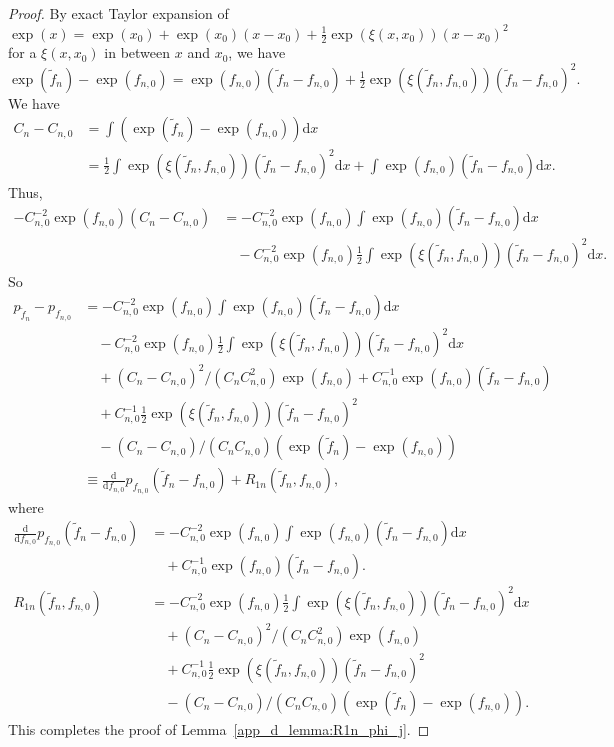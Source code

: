 \begin{proof}
By exact Taylor expansion of $\exp(x)=\exp(x_0)+\exp(x_0)(x-x_0)+\tfrac{1}{2}\exp(\xi(x,x_0))(x-x_0)^2$ for a $\xi(x,x_0)$ in between  $x$ and $x_0$, we have
\[
\exp(\tilde{f}_n)-\exp(f_{n,0})=\exp(f_{n,0})(\tilde{f}_n-f_{n,0})+\tfrac{1}{2}\exp(\xi(\tilde{f}_n,f_{n,0})) (\tilde{f}_n-f_{n,0})^2.\]
We have 
\begin{align} \label{eq:Taylor_exp_norm_const}
C_n-C_{n,0} &= \int (\exp(\tilde{f}_n)-\exp(f_{n,0})) \mathrm{d}x \nonumber\\
 &= \tfrac{1}{2}\int \exp(\xi(\tilde{f}_n,f_{n,0}))(\tilde{f}_n-f_{n,0})^2 \mathrm{d}x+
\int \exp(f_{n,0})(\tilde{f}_n-f_{n,0}) \mathrm{d}x.
\end{align}
Thus,
\begin{align*}
-C_{n,0}^{-2} \exp(f_{n,0})(C_n-C_{n,0}) 
 &= -C_{n,0}^{-2}\exp(f_{n,0})\int \exp(f_{n,0})(\tilde{f}_n-f_{n,0})\mathrm{d}x\\
 &\quad -C_{n,0}^{-2}\exp(f_{n,0}) \tfrac{1}{2} \int \exp(\xi(\tilde{f}_n,f_{n,0}))(\tilde{f}_n-f_{n,0})^2 \mathrm{d}x.
\end{align*}
So
\begin{align*}
p_{\tilde{f}_n}-p_{f_{n,0}} 
 &= -C_{n,0}^{-2}\exp(f_{n,0})\int \exp(f_{n,0})(\tilde{f}_n-f_{n,0})\mathrm{d}x\\
 &\quad -C_{n,0}^{-2}\exp(f_{n,0}) \tfrac{1}{2} \int \exp(\xi(\tilde{f}_n,f_{n,0}))(\tilde{f}_n-f_{n,0})^2 \mathrm{d}x\\
 &\quad +(C_n-C_{n,0})^2/(C_nC_{n,0}^2)\exp(f_{n,0})
+C_{n,0}^{-1}\exp(f_{n,0})(\tilde{f}_n-f_{n,0})\\
 &\quad +C_{n,0}^{-1}\tfrac{1}{2}\exp(\xi(\tilde{f}_n,f_{n,0}))(\tilde{f}_n-f_{n,0})^2\\
 &\quad -(C_n-C_{n,0})/(C_nC_{n,0})(\exp(\tilde{f}_n)-\exp(f_{n,0}))\\
 &\equiv \frac{\mathrm{d}}{\mathrm{d}f_{n,0}}p_{f_{n,0}}(\tilde{f}_n-f_{n,0})+R_{1n}(\tilde{f}_n,f_{n,0}),
\end{align*}
where
\begin{align*}
\frac{\mathrm{d}}{\mathrm{d}f_{n,0}}p_{f_{n,0}}(\tilde{f}_n-f_{n,0})
 &= -C_{n,0}^{-2}\exp(f_{n,0})\int \exp(f_{n,0})(\tilde{f}_n-f_{n,0})\mathrm{d}x\\
 &\quad +C_{n,0}^{-1}\exp(f_{n,0})(\tilde{f}_n-f_{n,0}).\\
R_{1n}(\tilde{f}_n,f_{n,0})
 &= -C_{n,0}^{-2}\exp(f_{n,0}) \tfrac{1}{2} \int \exp(\xi(\tilde{f}_n,f_{n,0}))(\tilde{f}_n-f_{n,0})^2 \mathrm{d}x\\
 &\quad +(C_n-C_{n,0})^2/(C_nC_{n,0}^2)\exp(f_{n,0})\\
 &\quad +C_{n,0}^{-1}\tfrac{1}{2}\exp(\xi(\tilde{f}_n,f_{n,0}))(\tilde{f}_n-f_{n,0})^2\\
 &\quad -(C_n-C_{n,0})/(C_nC_{n,0})(\exp(\tilde{f}_n)-\exp(f_{n,0})).
\end{align*}
This completes the proof of Lemma~\ref{app_d_lemma:R1n_phi_j}. 


\end{proof}
